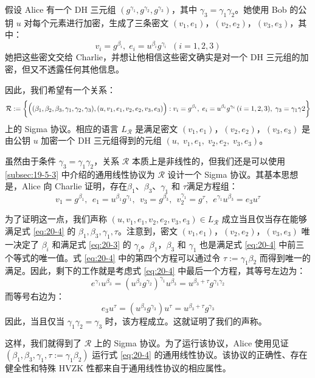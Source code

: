 \begin{example}\label{exmp:20-4}
假设 Alice 有一个 DH 三元组 $(g^{\gamma_1},g^{\gamma_2},g^{\gamma_3})$，其中 $\gamma_3=\gamma_1\gamma_2$。她使用 Bob 的公钥 $u$ 对每个元素进行加密，生成了三条密文 $(v_1,e_1)$，$(v_2,e_2)$，$(v_3,e_3)$，其中：
\begin{equation}\label{eq:20-3}
v_i=g^{\beta_i},\;
e_i=u^{\beta_i}g^{\gamma_i}\;\;
(i = 1,2,3)
\end{equation}
她把这些密文交给 Charlie，并想让他相信这些密文确实是对一个 DH 三元组的加密，但又不透露任何其他信息。

因此，我们希望有一个关系：
$$
\mathcal R:=
\bigg\lbrace
\Big((\beta_1,\beta_2,\beta_3,\gamma_1,\gamma_2,\gamma_3),(u,v_1,e_1,v_2,e_2,v_3,e_3)\Big):\\
v_i=g^{\beta_i},\;
e_i=u^{\beta_i}g^{\gamma_i}\,(i=1,2,3),\;
\gamma_3=\gamma_1\gamma2
\bigg\rbrace
$$
上的 Sigma 协议。相应的语言 $L_{\mathcal R}$ 是满足密文 $(v_1,e_1)$，$(v_2,e_2)$，$(v_3,e_3)$ 是由公钥 $u$ 加密一个 DH 三元组得到的元组 $(u,\;v_1,e_1,\;v_2,e_2,\;v_3,e_3)$。

虽然由于条件 $\gamma_3=\gamma_1\gamma_2$，关系 $\mathcal R$ 本质上是非线性的，但我们还是可以使用 \ref{subsec:19-5-3} 中介绍的通用线性协议为 $\mathcal R$ 设计一个 Sigma 协议。其基本思想是，Alice 向 Charlie 证明，存在$\beta_1$、$\beta_3$、$\gamma_1$ 和 $\tau$满足方程组：
\begin{equation}\label{eq:20-4}
v_1=g^{\beta_1},~~
e_1=u^{\beta_1}g^{\gamma_1},~~
v_3=g^{\beta_3},~~
v_2^{\gamma_1}=g^\tau,~~
e^{\gamma_1}u^{\beta_3}=e_3u^\tau
\end{equation}

为了证明这一点，我们声称 $(u,v_1,e_1,v_2,e_2,v_3,e_3)\in L_{\mathcal R}$ 成立当且仅当存在能够满足式 \ref{eq:20-4} 的 $\beta_1,\beta_3,\gamma_1,\tau$。注意到，密文 $(v_1,e_1)$，$(v_2,e_2)$，$(v_3,e_3)$ 唯一决定了 $\beta_i$ 和满足式 \ref{eq:20-3} 的 $\gamma_i$。$\beta_1$，$\beta_3$ 和 $\gamma_1$ 也是满足式 \ref{eq:20-4} 中前三个等式的唯一值。式 \ref{eq:20-4} 中的第四个方程可以通过令 $\tau:=\gamma_1\beta_2$ 而得到唯一的满足。因此，剩下的工作就是考虑式 \ref{eq:20-4} 中最后一个方程，其等号左边为：
$$
e^{\gamma_1}u^{\beta_3}=(u^{\beta_2}g^{\gamma_2})^{\gamma_1}u^{\beta_3}=u^{\beta_3+\tau}g^{\gamma_1\gamma_2}
$$
而等号右边为：
$$
e_3u^\tau=(u^{\beta_3}g^{\gamma_3})u^\tau =u^{\beta_3+\tau}g^{\gamma_3}
$$
因此，当且仅当 $\gamma_1\gamma_2=\gamma_3$ 时，该方程成立。这就证明了我们的声称。

这样，我们就得到了 $\mathcal R$ 上的 Sigma 协议。为了运行该协议，Alice 使用见证 $(\beta_1,\beta_3,\gamma_1,\tau:= \gamma_1\beta_2)$ 运行式 \ref{eq:20-4} 的通用线性协议。该协议的正确性、存在健全性和特殊 HVZK 性都来自于通用线性协议的相应属性。
\end{example}

